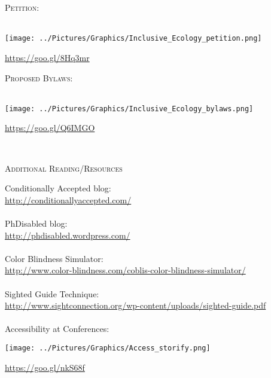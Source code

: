 \documentclass{beamer}
\begin{document}
\begin{center}
\begin{minipage}{0.25\linewidth}
~\\
~\\
\begin{minipage}{0.49\textwidth}
\textsc{Petition:}\\
~\\
\begin{minipage}{0.49\textwidth}
\texttt{[image: ../Pictures/Graphics/Inclusive\_Ecology\_petition.png]}\\ 
\end{minipage}
\begin{minipage}{0.49\textwidth}
\url{https://goo.gl/8Hq3mr}\\
\end{minipage}
\end{minipage}
\begin{minipage}{0.49\textwidth}
\textsc{Proposed Bylaws:}\\
~\\
\begin{minipage}{0.49\textwidth}
\texttt{[image: ../Pictures/Graphics/Inclusive\_Ecology\_bylaws.png]}\\
\end{minipage}
\begin{minipage}{0.49\textwidth} 
\url{https://goo.gl/Q6IMGO}\\
\end{minipage}
\end{minipage}
~\\
\begin{Large}
\textsc{Additional Reading/Resources}\\
\end{Large}
Conditionally Accepted blog:\\
\url{http://conditionallyaccepted.com/}\\
~\\
PhDisabled blog:\\
\url{http://phdisabled.wordpress.com/}\\
~\\
Color Blindness Simulator:\\
\url{http://www.color-blindness.com/coblis-color-blindness-simulator/}\\
~\\
Sighted Guide Technique:\\
\url{http://www.sightconnection.org/wp-content/uploads/sighted-guide.pdf}\\
~\\
Accessibility at Conferences:\\
\begin{minipage}{0.3\textwidth}
\texttt{[image: ../Pictures/Graphics/Access\_storify.png]}
\end{minipage}
\begin{minipage}{0.67\textwidth}
\url{https://goo.gl/nkS68f}\\
\end{minipage}
\\ 
\end{minipage}
\end{center}
\end{document}
